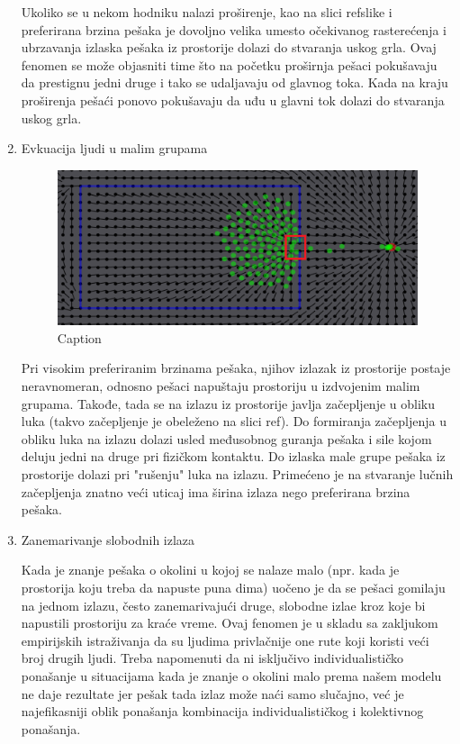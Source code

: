 \documentclass[12pt]{article}
\begin{document}
\begin{enumerate}
Ukoliko se u nekom hodniku nalazi proširenje, kao na slici refslike i preferirana brzina pešaka je dovoljno velika umesto očekivanog rasterećenja i ubrzavanja izlaska pešaka iz prostorije dolazi do stvaranja uskog grla. Ovaj fenomen se može objasniti time što na početku proširnja pešaci pokušavaju da prestignu jedni druge i tako se udaljavaju od glavnog toka. Kada na kraju proširenja pešaći ponovo pokušavaju da uđu u glavni tok dolazi do stvaranja uskog grla.

\item Evkuacija ljudi u malim grupama

\begin{figure}
\centering
\includegraphics{SCGrupa1}
\caption{Caption}
\label{fig:my_label2}
\end{figure}


Pri visokim preferiranim brzinama pešaka, njihov izlazak iz prostorije postaje neravnomeran, odnosno pešaci napuštaju prostoriju u izdvojenim malim grupama. Takođe, tada se na izlazu iz prostorije javlja začepljenje u obliku luka (takvo začepljenje je obeleženo na slici ref). Do formiranja začepljenja u obliku luka na izlazu dolazi usled međusobnog guranja pešaka i sile kojom deluju jedni na druge pri fizičkom kontaktu. Do izlaska male grupe pešaka iz prostorije dolazi pri "rušenju" luka na izlazu. Primećeno je na stvaranje lučnih začepljenja znatno veći uticaj ima širina izlaza nego preferirana brzina pešaka.

\item Zanemarivanje slobodnih izlaza

Kada je znanje pešaka o okolini u kojoj se nalaze malo (npr. kada je prostorija koju treba da napuste puna dima) uočeno je da se pešaci gomilaju na jednom izlazu, često zanemarivajući druge, slobodne izlae kroz koje bi napustili prostoriju za kraće vreme. Ovaj fenomen je u skladu sa zakljukom empirijskih istraživanja da su ljudima privlačnije one rute koji koristi veći broj drugih ljudi. Treba napomenuti da ni isključivo individualističko ponašanje u situacijama kada je znanje o okolini malo prema našem modelu ne daje rezultate jer pešak tada izlaz može naći samo slučajno, već je najefikasniji oblik ponašanja kombinacija individualističkog i kolektivnog ponašanja.


\end{enumerate}
    
\end{document}
